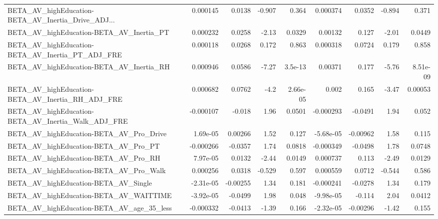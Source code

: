 \begin{tabular}{lrrrrrrrr}
BETA\_AV\_highEducation-BETA\_AV\_Inertia\_Drive\_ADJ... &    0.000145 &       0.0138 &   -0.907 &    0.364 &   0.000374 &      0.0352 &       -0.894 &         0.371 \\
BETA\_AV\_highEducation-BETA\_AV\_Inertia\_PT           &    0.000232 &       0.0258 &    -2.13 &   0.0329 &    0.00132 &       0.127 &        -2.01 &        0.0449 \\
BETA\_AV\_highEducation-BETA\_AV\_Inertia\_PT\_ADJ\_FRE   &    0.000118 &       0.0268 &    0.172 &    0.863 &   0.000318 &      0.0724 &        0.179 &         0.858 \\
BETA\_AV\_highEducation-BETA\_AV\_Inertia\_RH           &    0.000946 &       0.0586 &    -7.27 &  3.5e-13 &    0.00371 &       0.177 &        -5.76 &      8.51e-09 \\
BETA\_AV\_highEducation-BETA\_AV\_Inertia\_RH\_ADJ\_FRE   &    0.000682 &       0.0762 &     -4.2 & 2.66e-05 &      0.002 &       0.165 &        -3.47 &       0.00053 \\
BETA\_AV\_highEducation-BETA\_AV\_Inertia\_Walk\_ADJ\_FRE &   -0.000107 &       -0.018 &     1.96 &   0.0501 &  -0.000293 &     -0.0491 &         1.94 &         0.052 \\
BETA\_AV\_highEducation-BETA\_AV\_Pro\_Drive            &    1.69e-05 &      0.00266 &     1.52 &    0.127 &  -5.68e-05 &    -0.00962 &         1.58 &         0.115 \\
BETA\_AV\_highEducation-BETA\_AV\_Pro\_PT               &   -0.000266 &      -0.0357 &     1.74 &   0.0818 &  -0.000349 &     -0.0498 &         1.78 &        0.0748 \\
BETA\_AV\_highEducation-BETA\_AV\_Pro\_RH               &    7.97e-05 &       0.0132 &    -2.44 &   0.0149 &   0.000737 &       0.113 &        -2.49 &        0.0129 \\
BETA\_AV\_highEducation-BETA\_AV\_Pro\_Walk             &    0.000256 &       0.0318 &   -0.529 &    0.597 &   0.000559 &      0.0712 &       -0.544 &         0.586 \\
BETA\_AV\_highEducation-BETA\_AV\_Single               &   -2.31e-05 &     -0.00255 &     1.34 &    0.181 &  -0.000241 &     -0.0278 &         1.34 &         0.179 \\
BETA\_AV\_highEducation-BETA\_AV\_WAITTIME             &   -3.92e-05 &      -0.0499 &     1.98 &    0.048 &  -9.98e-05 &      -0.114 &         2.04 &        0.0412 \\
BETA\_AV\_highEducation-BETA\_AV\_age\_35\_less          &   -0.000332 &      -0.0413 &    -1.39 &    0.166 &  -2.32e-05 &    -0.00296 &        -1.42 &         0.155 \\

\end{tabular}
